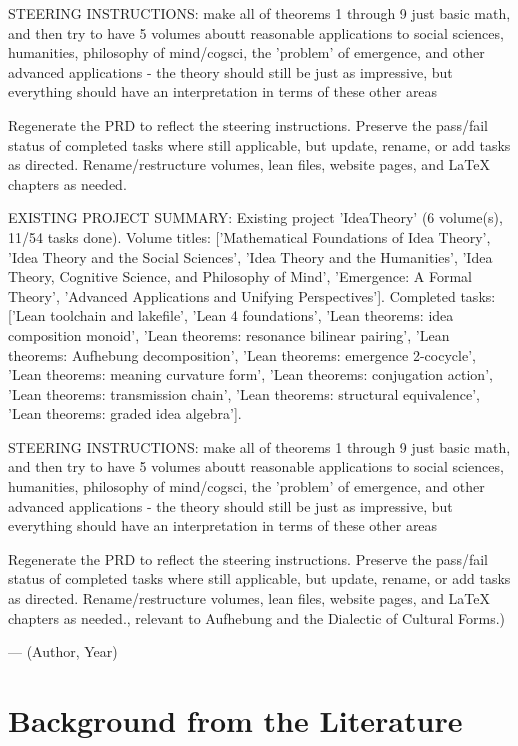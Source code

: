 {STEERING INSTRUCTIONS: make all of theorems 1 through 9 just basic math, and then try to have 5 volumes aboutt reasonable applications to social sciences, humanities, philosophy of mind/cogsci, the 'problem' of emergence, and other advanced applications - the theory should still be just as impressive, but everything should have an interpretation in terms of these other areas

Regenerate the PRD to reflect the steering instructions. Preserve the pass/fail status of completed tasks where still applicable, but update, rename, or add tasks as directed. Rename/restructure volumes, lean files, website pages, and LaTeX chapters as needed.

EXISTING PROJECT SUMMARY: Existing project 'IdeaTheory' (6 volume(s), 11/54 tasks done). Volume titles: ['Mathematical Foundations of Idea Theory', 'Idea Theory and the Social Sciences', 'Idea Theory and the Humanities', 'Idea Theory, Cognitive Science, and Philosophy of Mind', 'Emergence: A Formal Theory', 'Advanced Applications and Unifying Perspectives']. Completed tasks: ['Lean toolchain and lakefile', 'Lean 4 foundations', 'Lean theorems: idea composition monoid', 'Lean theorems: resonance bilinear pairing', 'Lean theorems: Aufhebung decomposition', 'Lean theorems: emergence 2-cocycle', 'Lean theorems: meaning curvature form', 'Lean theorems: conjugation action', 'Lean theorems: transmission chain', 'Lean theorems: structural equivalence', 'Lean theorems: graded idea algebra'].

STEERING INSTRUCTIONS: make all of theorems 1 through 9 just basic math, and then try to have 5 volumes aboutt reasonable applications to social sciences, humanities, philosophy of mind/cogsci, the 'problem' of emergence, and other advanced applications - the theory should still be just as impressive, but everything should have an interpretation in terms of these other areas

Regenerate the PRD to reflect the steering instructions. Preserve the pass/fail status of completed tasks where still applicable, but update, rename, or add tasks as directed. Rename/restructure volumes, lean files, website pages, and LaTeX chapters as needed., relevant to Aufhebung and the Dialectic of Cultural Forms.)}{--- (Author, Year)}

        \section{Background from the Literature}
        \label{sec:v3c6.lit}

